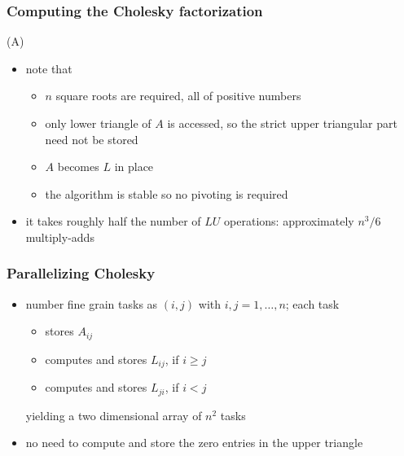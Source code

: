 \begin{frame}[fragile]
%
  \frametitle{Computing the Cholesky factorization}
%
    \begin{center}
      \begin{minipage}{.85\linewidth}
        \begin{algorithm}[H]
          \label{alg:cholesky}
%
          \dontprintsemicolon
          \setalcaphskip{0ex}
%
          \caption{\cholesky(A)}
%
%
        \end{algorithm}
      \end{minipage}
    \end{center}
%
  \begin{itemize}
%
  \item note that
    \begin{itemize}
    \item $n$ square roots are required, all of positive numbers 
    \item only lower triangle of $A$ is accessed, so the strict upper triangular part need not
      be stored
    \item $A$ becomes $L$ in place
    \item the algorithm is stable so no pivoting is required
    \end{itemize}
%
  \item it takes roughly half the number of $LU$ operations: approximately $n^{3}/6$
    multiply-adds
  \end{itemize}
%
\end{frame}

\begin{frame}[fragile]
%
  \frametitle{Parallelizing Cholesky}
%
  \begin{itemize}
%
  \item number fine grain tasks as $(i,j)$ with $i,j = 1, \ldots, n$; each task
    \begin{itemize}
    \item stores $A_{ij}$
    \item computes and stores $L_{ij}$, if $i \geq j$
    \item computes and stores $L_{ji}$, if $i < j$
    \end{itemize}
    yielding a two dimensional array of $n^{2}$ tasks
%
  \item no need to compute and store the zero entries in the upper triangle
%
  \end{itemize}
%
\end{frame}

